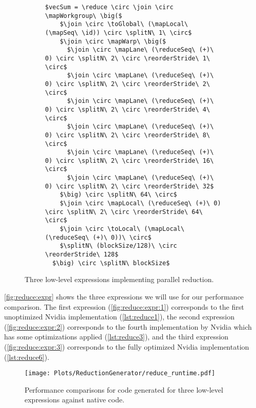 \begin{figure*}[t]
\begin{subfigure}[b]{\linewidth}
\vspace{0em}
\begin{minipage}{.05\linewidth}
\caption{}
\label{fig:reduce:expr:3}
\end{minipage}
\hfill
\begin{minipage}{.9\linewidth}
\begin{lstlisting}[mathescape, basicstyle=\small\rmfamily]
$vecSum = \reduce \circ \join \circ \mapWorkgroup\ \big($
    $\join \circ \toGlobal\ (\mapLocal\ (\mapSeq\ \id)) \circ \splitN\ 1\ \circ$
    $\join \circ \mapWarp\ \big($
      $\join \circ \mapLane\ (\reduceSeq\ (+)\ 0) \circ \splitN\ 2\ \circ \reorderStride\ 1\ \circ$
      $\join \circ \mapLane\ (\reduceSeq\ (+)\ 0) \circ \splitN\ 2\ \circ \reorderStride\ 2\ \circ$
      $\join \circ \mapLane\ (\reduceSeq\ (+)\ 0) \circ \splitN\ 2\ \circ \reorderStride\ 4\ \circ$
      $\join \circ \mapLane\ (\reduceSeq\ (+)\ 0) \circ \splitN\ 2\ \circ \reorderStride\ 8\ \circ$
      $\join \circ \mapLane\ (\reduceSeq\ (+)\ 0) \circ \splitN\ 2\ \circ \reorderStride\ 16\ \circ$
      $\join \circ \mapLane\ (\reduceSeq\ (+)\ 0) \circ \splitN\ 2\ \circ \reorderStride\ 32$
    $\big) \circ \splitN\ 64\ \circ$
    $\join \circ \mapLocal\ (\reduceSeq\ (+)\ 0) \circ \splitN\ 2\ \circ \reorderStride\ 64\ \circ$
    $\join \circ \toLocal\ (\mapLocal\ (\reduceSeq\ (+)\ 0))\ \circ$
    $\splitN\ (blockSize/128)\ \circ \reorderStride\ 128$
  $\big) \circ \splitN\ blockSize$
\end{lstlisting}
\end{minipage}
\end{subfigure}

\caption{Three low-level expressions implementing parallel reduction.}
\label{fig:reduce:expr}
\end{figure*}


\autoref{fig:reduce:expr} shows the three expressions we will use for our performance comparison.
The first expression (\autoref{fig:reduce:expr:1}) corresponds to the first unoptimized Nvidia implementation (\autoref{lst:reduce1}),
the second expression (\autoref{fig:reduce:expr:2}) corresponds to the fourth implementation by Nvidia which has some optimizations applied (\autoref{lst:reduce3}), and
the third expression (\autoref{fig:reduce:expr:3}) corresponds to the fully optimized Nvidia implementation (\autoref{lst:reduce6}).


\begin{figure}
  \centering
  \texttt{[image: Plots/ReductionGenerator/reduce\_runtime.pdf]}
  \caption{Performance comparisons for code generated for three low-level expressions against native \OpenCL code.}
  \label{fig:reduce:expr:performance}
\end{figure}

